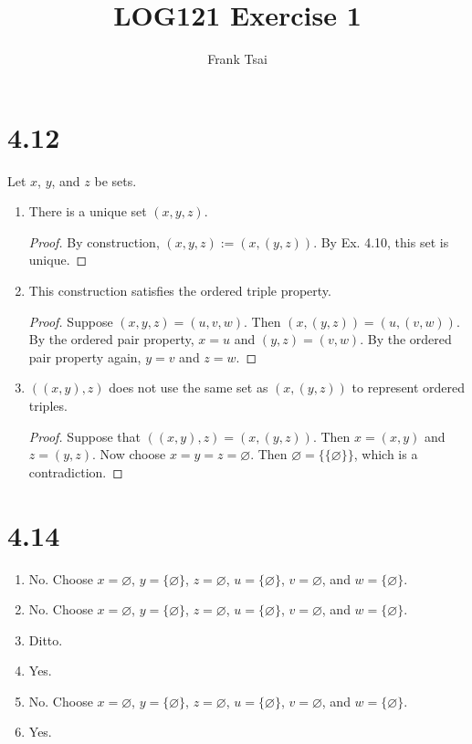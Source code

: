 \documentclass[a4paper]{article}
\title{LOG121 Exercise 1}
\author{Frank Tsai}
\begin{document}
\maketitle

\section{4.12}
Let $x$, $y$, and $z$ be sets.
\begin{enumerate}
\item There is a unique set $(x,y,z)$.
  \begin{proof}
    By construction, $(x,y,z) := (x,(y,z))$.
    By Ex. 4.10, this set is unique. \qedhere
  \end{proof}
\item This construction satisfies the ordered triple property.
  \begin{proof}
    Suppose $(x,y,z) = (u,v,w)$.
    Then $(x,(y,z)) = (u,(v,w))$.
    By the ordered pair property, $x = u$ and $(y,z) = (v,w)$.
    By the ordered pair property again, $y = v$ and $z = w$.
  \end{proof}
\item $((x,y),z)$ does not use the same set as $(x,(y,z))$ to represent ordered triples.
  \begin{proof}
    Suppose that $((x,y),z) = (x,(y,z))$.
    Then $x = (x,y)$ and $z = (y,z)$.
    Now choose $x = y = z = \varnothing$.
    Then $\varnothing = \{\{\varnothing\}\}$, which is a contradiction.
  \end{proof}
\end{enumerate}

\section{4.14}
\begin{enumerate}
\item No. Choose $x = \varnothing$, $y = \{\varnothing\}$, $z = \varnothing$, $u = \{\varnothing\}$, $v = \varnothing$, and $w = \{\varnothing\}$.
\item No. Choose $x = \varnothing$, $y = \{\varnothing\}$, $z = \varnothing$, $u = \{\varnothing\}$, $v = \varnothing$, and $w = \{\varnothing\}$.
\item Ditto.
\item Yes.
\item No. Choose $x = \varnothing$, $y = \{\varnothing\}$, $z = \varnothing$, $u = \{\varnothing\}$, $v = \varnothing$, and $w = \{\varnothing\}$.
\item Yes.
\end{enumerate}

\end{document}
